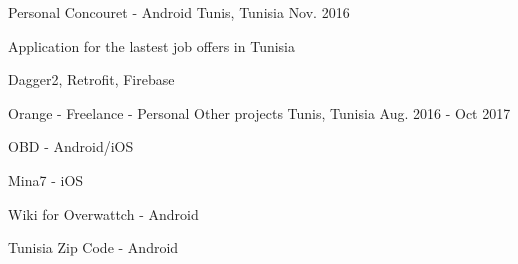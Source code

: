 \begin{cventries}
 \cventrydetailed
    {Personal} %
    {Concouret - Android} %
    {Tunis, Tunisia} %
    {Nov. 2016} %
    {
    	\begin{cvitems} %
    		\item {Application for the lastest job offers in Tunisia}
    	\end{cvitems}
    }
    {Dagger2, Retrofit, Firebase} %
    
    \cventry
    {Orange - Freelance - Personal} %
    {Other projects} %
    {Tunis, Tunisia} %
    {Aug. 2016 - Oct 2017} %
    {
    	\begin{cvitems} %
    		\item {OBD - Android/iOS}
    		\item {Mina7 - iOS}
    		\item {Wiki for Overwattch - Android}
    		\item {Tunisia Zip Code - Android}
    	\end{cvitems}
    }

\end{cventries}
